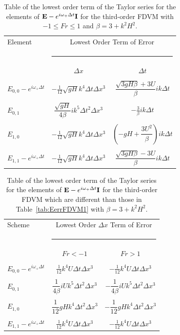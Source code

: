 \begin{table}
	\begin{tabular}{l  c c}
	\hline
		Element & \multicolumn{2}{c}{Lowest Order Term of Error}\\
		&  \multicolumn{2}{l}{\rule{0.7\textwidth}{0.4pt}} \\
		& $\Delta x$&$\Delta t$\\
		\hline && \\
		$E_{0,0} -  e^{i \omega_+ \Delta t} $& $ - \frac{1}{12} \sqrt{gH} k^4 \Delta t\Delta x^3$ & $\dfrac{\sqrt{3gH \beta} + 3U}{\beta} ik \Delta t$ \\ & & \\
		$E_{0,1}$& $ \dfrac{\sqrt{gH}}{4 \beta}i k^5\Delta  t ^2\Delta x^3$ &  $ - \frac{3}{\beta} ik\Delta t$ \\ & & \\
		$E_{1,0}$& $ - \frac{1}{12} \sqrt{gH} k^4 \Delta t\Delta x^3$ &  $ \left(-gH + \dfrac{3U^2}{\beta}\right)ik \Delta t$ \\ & & \\
		$E_{1,1} -  e^{i \omega_+ \Delta t}$& $ - \frac{1}{12} \sqrt{gH} k^4 \Delta t\Delta x^3$ & $\dfrac{\sqrt{3gH \beta} - 3U}{\beta} ik \Delta t$ \\  \hline
	\end{tabular}
	\caption{Table of the lowest order term of the Taylor series for the elements of $\mathbf{E} - e^{i \omega_+ \Delta t} \mathbf{I}$ for the third-order FDVM with $ -1 \le Fr \le 1$ and $\beta = 3 + k^2 H^2$.}
	\label{tab:EerrFDVM3} 
\end{table}

\begin{table}
	\begin{tabular}{l  c  c}
	\hline
		Scheme &\multicolumn{2}{c}{Lowest Order $\Delta x$ Term of Error}\\
		&  \multicolumn{2}{l}{\rule{0.7\textwidth}{0.4pt}} \\
		& $Fr < - 1$&$ Fr >1$\\
		\hline & \\
		$E_{0,0} -  e^{i \omega_+ \Delta t} $& $\frac{1}{12} k^4 U \Delta t \Delta x^3$ &  $ -\frac{1}{12} k^4 U \Delta t \Delta x^3$ \\  &  \\
		$E_{0,1}$& $\dfrac{1}{4 \beta}iUk^5 \Delta t^2 \Delta x^3 $ & $-\dfrac{1}{4 \beta}iUk^5 \Delta t^2 \Delta x^3 $   \\  &  \\
		$E_{1,0}$& $\dfrac{1}{12} gHk^4 \Delta t^2 \Delta x^3 $ & $-\dfrac{1}{12} gHk^4 \Delta t^2 \Delta x^3 $  \\  &  \\
		$E_{1,1} -  e^{i \omega_+ \Delta t}$& $ \frac{1}{12} k^4 U \Delta t \Delta x^3$ & $ -\frac{1}{12} k^4 U \Delta t \Delta x^3$   \\ \hline
	\end{tabular}
	\caption{Table of the lowest order term of the Taylor series for the elements of $\mathbf{E} - e^{i \omega_+ \Delta t} \mathbf{I}$ for the third-order FDVM which are different than those in Table~\ref{tab:EerrFDVM1} with  $\beta = 3 + k^2 H^2$. }
	\label{tab:EerrFDVM3super} 
\end{table}

